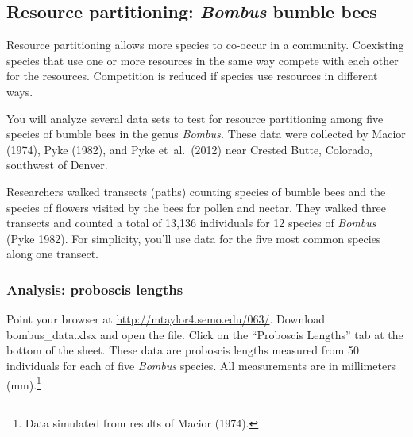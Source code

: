 \documentclass[12pt, hidelinks]{exam}
\begin{document}
\subsection*{Resource partitioning: \textit{Bombus} bumble bees}

Resource partitioning allows more species to co-occur in a community.
Coexisting species that use one or more resources in the same way compete
with each other for the resources. Competition is reduced if species
use resources in different ways.



You will analyze several data sets to test for resource partitioning among five
species of bumble bees in the genus \textit{Bombus.} These data were collected
by Macior (1974), Pyke (1982), and Pyke et~al.~(2012) near Crested Butte, Colorado,
southwest of Denver.

Researchers walked transects (paths) counting species of bumble bees and the 
species of flowers visited by the bees for pollen and nectar. They walked
three transects and counted a total of 13,136 individuals for 12 species of 
\textit{Bombus} (Pyke 1982). For simplicity, you'll use data for the five most common 
species along one transect.


\subsubsection*{Analysis: proboscis lengths}

Point your browser at \url{http://mtaylor4.semo.edu/063/}. Download bombus\_data.xlsx and open the file. Click on the “Proboscis Lengths” tab at the bottom of the sheet. These data are
 proboscis lengths measured from 50 individuals for each of five \textit{Bombus} species. All measurements are in millimeters (mm).\footnote{Data simulated  from results of Macior (1974).}
\end{document}
